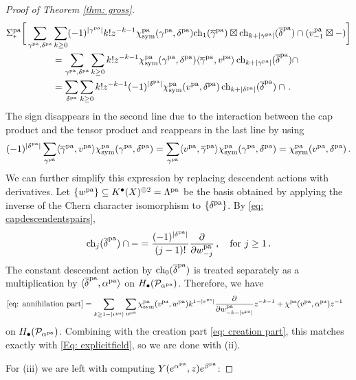 \documentclass[a4paper, 12pt]{amsart}
\begin{document}
\begin{proof}[Proof of Theorem \ref{thm: gross}]
\begin{align}\label{eq: annihilation part}
    \Sigma^{\pa}_*\bigg[\sum_{\gamma^{\pa}, \delta^{\pa}}\nonumber
    &\sum_{k\geq 0}(-1)^{|\gamma^{\pa}|}k!z^{-k-1}
    \chi^{\pa}_\sym(\gamma^{\pa}, \delta^{\pa})\ch_1(\overline \gamma^{\pa})\boxtimes\ch_{k+|\gamma^{\pa}|}(\overline \delta^{\pa})\cap (v^{\pa}_{-1}\boxtimes-)\bigg]\nonumber\\
    &=\sum_{\gamma^{\pa}, \delta^{\pa}}\sum_{k\geq 0}k!z^{-k-1}
    \chi^{\pa}_\sym(\gamma^{\pa}, \delta^{\pa})\langle\overline{\gamma}^{\pa},v^{\pa}\rangle\,\ch_{k+|\gamma^{\pa}|}(\overline \delta^{\pa})\cap \nonumber\\
    &=\sum_{\delta^{\pa}}\sum_{k\geq 0}k!z^{-k-1}
    (-1)^{|\delta^{\pa}|}\chi^{\pa}_\sym(v^{\pa}, \delta^{\pa})\,\ch_{k+|\delta^{\pa}|}(\overline \delta^{\pa})\cap\,.
\end{align}
The sign disappears in the second line due to the interaction between the cap product and the tensor product \cite[12.17]{dold} and reappears in the last line by using
\[(-1)^{|\delta^{\pa}|}\sum_{\gamma^{\pa}}\langle\overline{\gamma}^{\pa},v^{\pa}\rangle\chi^{\pa}_\sym(\gamma^{\pa}, \delta^{\pa})=\sum_{\gamma^{\pa}}\langle v^{\pa}, \overline{\gamma}^{\pa}\rangle\chi^{\pa}_\sym(\gamma^{\pa}, \delta^{\pa})=\chi^{\pa}_\sym(v^{\pa}, \delta^{\pa})\,.\]
We can further simplify this expression by replacing descendent actions with derivatives. Let $\{w^{\pa}\}\subseteq K^\bullet(X)^{\oplus 2}=\Lambda^{\pa}$ be the basis obtained by applying the inverse of the Chern character isomorphism to $\{\delta^{\pa}\}$. By \eqref{eq: capdescendentspairs},
\[\ch_j(\overline \delta^{\pa})\cap -=\frac{(-1)^{|\delta^{\pa}|}}{(j-1)!}\frac{\partial}{\partial w^{\pa}_{-j}}\, ,\quad \textup{for }j\geq 1\,. \]
The constant descendent action by $\ch_0(\overline{\delta}^{\pa})$ is treated separately as a multiplication by $\langle \overline{\delta}^{\pa},\alpha^{\pa}\rangle$ on $H_\bullet(\CP_{\alpha^{\pa}})$. Therefore, we have 
\begin{align*}
    \eqref{eq: annihilation part}
    &=\sum_{k\geq 1-|v^{\pa}|}\sum_{w^{\pa}}\chi^{\pa}_{\sym}(v^{\pa},w^{\pa})k^{1-|v^{\pa}|}\frac{\partial}{\partial w^{\pa}_{-k-|v^{\pa}|}} z^{-k-1}+\chi^{\pa}(v^{\pa},\alpha^{\pa})z^{-1}
\end{align*}
on $H_\bullet(\CP_{\alpha^{\pa}})$. Combining with the creation part \eqref{eq: creation part}, this matches exactly with \eqref{Eq: explicitfield}, so we are done with (ii).

For (iii) we are left with computing $Y(e^{\alpha^{\pa}},z)e^{\beta^{\pa}}$:


\end{proof}
\end{document}
